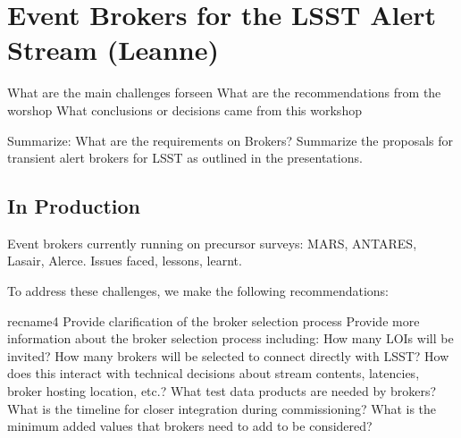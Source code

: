 

\section{Event Brokers for the LSST Alert Stream (Leanne)} \label{sec:lsstbrokers}


What are the main challenges forseen 
What are the recommendations from the worshop 
What conclusions or decisions came from this workshop

Summarize: 
What are the requirements on Brokers? 
Summarize the proposals for transient alert brokers for LSST as outlined in the presentations. 

\subsection{In Production}
Event brokers currently running on precursor surveys: MARS, ANTARES, Lasair, Alerce. Issues faced, lessons, learnt. 


To address these challenges, we make the following recommendations:

{recname4}
{Provide clarification of the broker selection process}
{Provide more information about the broker selection process including:
How many LOIs will be invited?
How many brokers will be selected to connect directly with LSST? How does this interact with technical decisions about stream contents, latencies, broker hosting location, etc.?
What test data products are needed by brokers?
What is the timeline for closer integration during commissioning?
What is the minimum added values that brokers need to add to be considered?
}